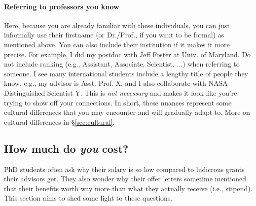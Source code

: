 \documentclass[11pt]{article}
\begin{document}
\paragraph{Referring to professors you know} Here, because you are already familiar with these individuals, you can just informally use their firstname (or Dr./Prof., if you want to be formal) as mentioned above. You can also include their institution if it makes it more precise.  For example, I did my postdoc with Jeff Foster at Univ. of Maryland.   Do not include ranking (e.g., Assistant, Associate, Scientist, ...) when referring to someone. I see many international students include a lengthy title of people they know, e.g., my advisor is Asst. Prof. X, and I also collaborate with NASA Distinguished Scientist Y.  This is \emph{not necessary} and makes it look like you're trying to show off your connections. In short, these nuances represent some cultural differences that you may encounter and will gradually adapt to. More on cultural differences in \S\ref{sec:cultural}.

\subsection{How much do \emph{you} cost?}\label{sec:ra-cost}
PhD students often ask why their salary is so low compared to ludicrous grants their advisors get. They also wonder why their offer letters sometime mentioned that their benefits worth way more than what they actually receive (i.e., stipend).  This section aims to shed some light to these questions.
\end{document}
